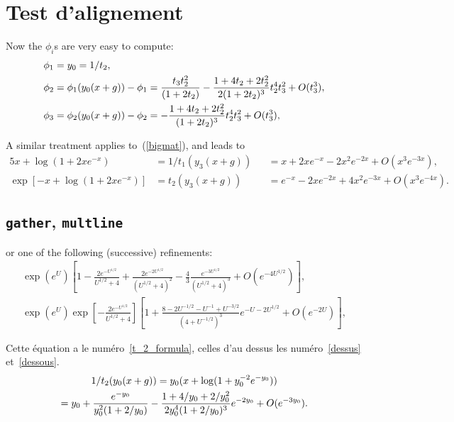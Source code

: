 \documentclass{article}
\numberwithin{equation}{section}
\begin{document}
\section{Test d'alignement}
Now the $\phi_i$s are very easy to compute:
\begin{align*}
\phi_1&  =  y_0 = 1/t_2,\\
\phi_2&  = \phi_1(y_0(x+g))-\phi_1 = {t_3t_2^2\over(1+2t_2)}
-{1+4t_2+2t_2^2\over2(1+2t_2)^3}t_2^4t_3^2+O(t_3^3),\\
\phi_3&  = \phi_2(y_0(x+g))-\phi_2 = -{1+4t_2+2t_2^2\over(1+2t_2)^3}t_2^4t_3^2+O(t_3^3),
\end{align*}

A similar treatment applies to~(\ref{bigmat}), and leads to
\begin{alignat*}{5}
x+\log(1+2xe^{-x})&  =  1/t_1(y_3(x+g))&&  =  x+2xe^{-x}-2x^2e^{-2x}+O(x^3e^{-3x}),\\
\exp[-x+\log(1+2xe^{-x})]&  =  t_2(y_3(x+g))&&  =  e^{-x}-2xe^{-2x}+4x^2e^{-3x}+O(x^3e^{-4x}).
\end{alignat*}

\subsection{\texttt{gather}, \texttt{multline}}
or one of the following (successive) refinements:
\begin{gather}\label{dessus}
\exp(e^U)\left[1-\frac{2e^{-U^{1/2}}}{U^{1/2}+4}
+\frac{2e^{-2U^{1/2}}}{(U^{1/2}+4)^2}
-\frac{4}{3}\frac{e^{-3U^{1/2}}}{(U^{1/2}+4)^3}+O(e^{-4U^{1/2}})\right],\\
\exp(e^U)\exp\left[-\frac{2e^{-U^{1/2}}}{U^{1/2}+4}\right]\left[1+
\frac{8-2U^{-1/2}-U^{-1}+U^{-3/2}}{(4+U^{-1/2})^3}
e^{-U-2U^{1/2}}+O(e^{-2U})\right],\label{dessous}
\end{gather}

Cette \'equation a le num\'ero~\ref{t_2_formula}, celles d'au dessus les
num\'ero~\ref{dessus} et~\ref{dessous}.
\begin{multline}	\label{t_2_formula}
1/t_2(y_0(x+g)) = y_0(x+\log(1+y_0^{-2}e^{-y_0}))\\
 = y_0+{e^{-y_0}\over y_0^2(1+2/y_0)}
-{1+4/y_0+2/y_0^2\over 2y_0^4(1+2/y_0)^3}e^{-2y_0}+O(e^{-3y_0}).
\end{multline}
\end{document}
